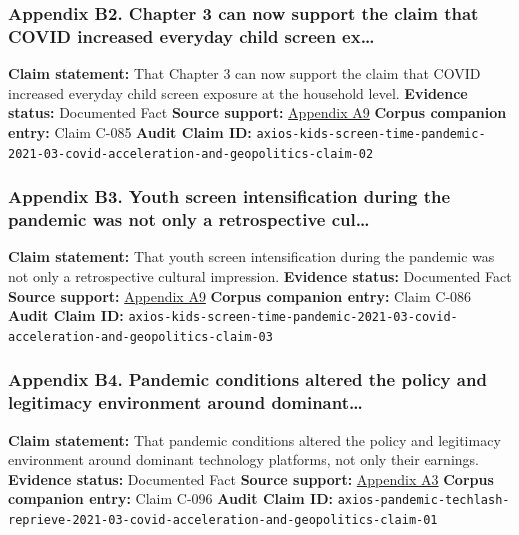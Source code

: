 \documentclass[
  american,
  11pt,
  letterpaper,
]{article}
\begin{document}
\subsubsection{Appendix B2. Chapter 3 can now support the claim that
COVID increased everyday child screen
ex\ldots{}}\label{ch-03-appendix-b2-chapter-3-can-now-support-the-claim-that-covid-increased-everyday-child-screen-ex}

\textbf{Claim statement:} That Chapter 3 can now support the claim that
COVID increased everyday child screen exposure at the household level.
\textbf{Evidence status:} Documented Fact \textbf{Source support:}
\hyperref[ch-03-appendix-a9-kids-screen-time-up-50-during-pandemic]{Appendix
A9} \textbf{Corpus companion entry:} Claim C-085 \textbf{Audit Claim
ID:}
\texttt{axios-kids-screen-time-pandemic-2021-03-covid-acceleration-and-geopolitics-claim-02}

\subsubsection{Appendix B3. Youth screen intensification during the
pandemic was not only a retrospective
cul\ldots{}}\label{ch-03-appendix-b3-youth-screen-intensification-during-the-pandemic-was-not-only-a-retrospective-cul}

\textbf{Claim statement:} That youth screen intensification during the
pandemic was not only a retrospective cultural impression.
\textbf{Evidence status:} Documented Fact \textbf{Source support:}
\hyperref[ch-03-appendix-a9-kids-screen-time-up-50-during-pandemic]{Appendix
A9} \textbf{Corpus companion entry:} Claim C-086 \textbf{Audit Claim
ID:}
\texttt{axios-kids-screen-time-pandemic-2021-03-covid-acceleration-and-geopolitics-claim-03}

\subsubsection{Appendix B4. Pandemic conditions altered the policy and
legitimacy environment around
dominant\ldots{}}\label{ch-03-appendix-b4-pandemic-conditions-altered-the-policy-and-legitimacy-environment-around-dominant}

\textbf{Claim statement:} That pandemic conditions altered the policy
and legitimacy environment around dominant technology platforms, not
only their earnings. \textbf{Evidence status:} Documented Fact
\textbf{Source support:}
\hyperref[ch-03-appendix-a3-pandemic-provides-a-techlash-reprieve]{Appendix
A3} \textbf{Corpus companion entry:} Claim C-096 \textbf{Audit Claim
ID:}
\texttt{axios-pandemic-techlash-reprieve-2021-03-covid-acceleration-and-geopolitics-claim-01}
\end{document}
